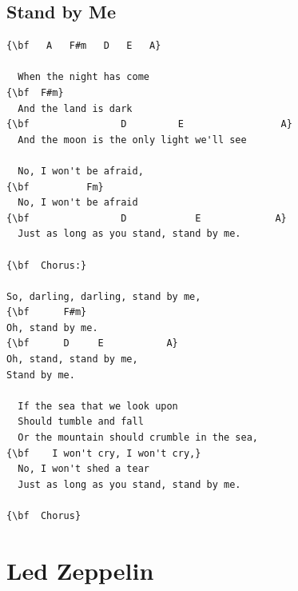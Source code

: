 \documentclass[a4paper]{article}
\begin{document}
\subsection{Stand by Me}
\begin{multicols}{2}\begin{Verbatim}[commandchars=\\\{\}]
{\bf   A   F#m   D   E   A}

  When the night has come
{\bf  F#m}
  And the land is dark
{\bf                D         E                 A}
  And the moon is the only light we'll see

  No, I won't be afraid,
{\bf          Fm}
  No, I won't be afraid
{\bf                D            E             A}
  Just as long as you stand, stand by me.

{\bf  Chorus:}

So, darling, darling, stand by me,
{\bf      F#m}
Oh, stand by me.
{\bf      D     E           A}
Oh, stand, stand by me,
Stand by me.

  If the sea that we look upon
  Should tumble and fall
  Or the mountain should crumble in the sea,
{\bf    I won't cry, I won't cry,}
  No, I won't shed a tear
  Just as long as you stand, stand by me.

{\bf  Chorus}

\end{Verbatim}
\end{multicols}\newpage
\section{Led Zeppelin}
\end{document}
